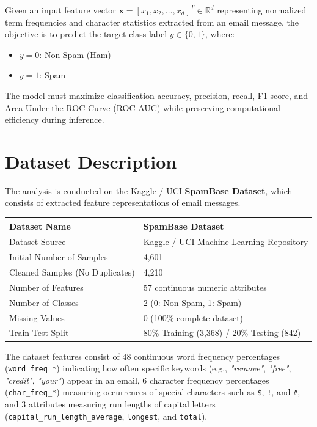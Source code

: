 \documentclass[12pt,a4paper]{article}
\begin{document}
Given an input feature vector $\mathbf{x} = [x_1, x_2, \dots, x_d]^T \in \mathbb{R}^d$ representing normalized term frequencies and character statistics extracted from an email message, the objective is to predict the target class label $y \in \{0, 1\}$, where:
\begin{itemize}
    \item $y = 0$: Non-Spam (Ham)
    \item $y = 1$: Spam
\end{itemize}
The model must maximize classification accuracy, precision, recall, F1-score, and Area Under the ROC Curve (ROC-AUC) while preserving computational efficiency during inference.

\section{Dataset Description}
The analysis is conducted on the Kaggle / UCI \textbf{SpamBase Dataset}, which consists of extracted feature representations of email messages.

\begin{longtable}{|p{6cm}|p{8cm}|}
\hline
Dataset Name & SpamBase Dataset \\ \hline
Dataset Source & Kaggle / UCI Machine Learning Repository \\ \hline
Initial Number of Samples & 4,601 \\ \hline
Cleaned Samples (No Duplicates) & 4,210 \\ \hline
Number of Features & 57 continuous numeric attributes \\ \hline
Number of Classes & 2 (0: Non-Spam, 1: Spam) \\ \hline
Missing Values & 0 (100\% complete dataset) \\ \hline
Train-Test Split & 80\% Training (3,368) / 20\% Testing (842) \\ \hline
\end{longtable}

The dataset features consist of 48 continuous word frequency percentages (\texttt{word\_freq\_*}) indicating how often specific keywords (e.g., \textit{"remove"}, \textit{"free"}, \textit{"credit"}, \textit{"your"}) appear in an email, 6 character frequency percentages (\texttt{char\_freq\_*}) measuring occurrences of special characters such as \texttt{\$}, \texttt{!}, and \texttt{\#}, and 3 attributes measuring run lengths of capital letters (\texttt{capital\_run\_length\_average}, \texttt{longest}, and \texttt{total}).
\end{document}

